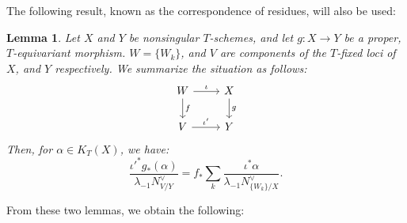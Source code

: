 \documentclass{amsart}
\newtheorem{lemma}[thm]{Lemma}
\begin{document}
The following result, known as the correspondence of residues, will also be used:
\begin{lemma}\label{residue}
    Let $X$ and $Y$ be nonsingular  $T$-schemes, and let $g:X \to Y$ be a proper, $T$-equivariant morphism. $W = \{W_k\}$, and $V$ are components of the $T$-fixed loci of $X$, and $Y$ respectively. We summarize the situation as follows:
\begin{equation*}
    \begin{tikzcd} 
  W \ar[r, "\iota"] \ar[d, "f"] & X \ar[d, "g"] \\
  V \ar[r, "\iota'"] & Y
\end{tikzcd}
\end{equation*}
Then, for $\alpha \in K_T(X)$, we have:
\[
\frac{\iota'^*g_*(\alpha)}{\lambda_{-1}N^{\vee}_{V/Y}} = f_*\sum_{k}\frac{\iota^*\alpha}{\lambda_{-1}N^{\vee}_{\{W_k\}/X}}.
\]
\end{lemma}

From these two lemmas, we obtain the following:
\end{document}
